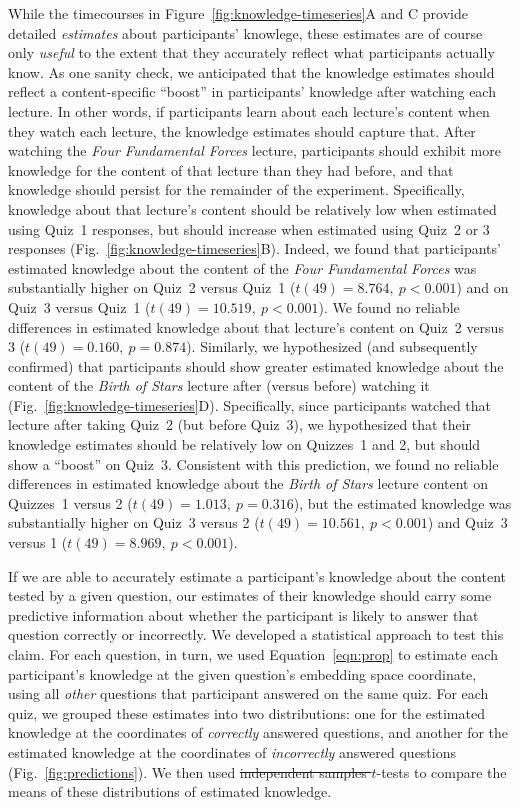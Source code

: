 \documentclass[10pt]{article}
\providecommand{\DIFaddtex}[1]{{\protect\color{blue}\uwave{#1}}} %
\providecommand{\DIFdeltex}[1]{{\protect\color{red}\sout{#1}}}                      %
\providecommand{\DIFaddbegin}{} %
\providecommand{\DIFaddend}{} %
\providecommand{\DIFdelbegin}{} %
\providecommand{\DIFdelend}{} %
\providecommand{\DIFadd}[1]{\texorpdfstring{\DIFaddtex{#1}}{#1}} %
\providecommand{\DIFdel}[1]{\texorpdfstring{\DIFdeltex{#1}}{}} %
\newcommand{\DIFscaledelfig}{0.5}
\newlength{\DIFdelgraphicswidth} %
\newlength{\DIFdelgraphicsheight} %
\newcommand{\DIFaddincludegraphics}[2][]{{\color{blue}\fbox{\DIFOincludegraphics[#1]{#2}}}} %
\newcommand{\DIFdelincludegraphics}[2][]{%
\sbox{\DIFdelgraphicsbox}{\DIFOincludegraphics[#1]{#2}}%
\settoboxwidth{\DIFdelgraphicswidth}{\DIFdelgraphicsbox} %
\settoboxtotalheight{\DIFdelgraphicsheight}{\DIFdelgraphicsbox} %
\scalebox{\DIFscaledelfig}{%
\parbox[b]{\DIFdelgraphicswidth}{\usebox{\DIFdelgraphicsbox}\\[-\baselineskip] \rule{\DIFdelgraphicswidth}{0em}}\llap{\resizebox{\DIFdelgraphicswidth}{\DIFdelgraphicsheight}{%
\setlength{\unitlength}{\DIFdelgraphicswidth}%
\begin{picture}(1,1)%
\thicklines\linethickness{2pt} %
{\color[rgb]{1,0,0}\put(0,0){\framebox(1,1){}}}%
{\color[rgb]{1,0,0}\put(0,0){\line( 1,1){1}}}%
{\color[rgb]{1,0,0}\put(0,1){\line(1,-1){1}}}%
\end{picture}%
}\hspace*{3pt}}} %
} %
\DeclareRobustCommand{\DIFaddbegin}{\DIFOaddbegin \let\includegraphics\DIFaddincludegraphics} %
\DeclareRobustCommand{\DIFaddend}{\DIFOaddend \let\includegraphics\DIFOincludegraphics} %
\DeclareRobustCommand{\DIFdelbegin}{\DIFOdelbegin \let\includegraphics\DIFdelincludegraphics} %
\DeclareRobustCommand{\DIFdelend}{\DIFOaddend \let\includegraphics\DIFOincludegraphics} %
\begin{document}
While the timecourses in Figure~\ref{fig:knowledge-timeseries}A and C provide
detailed \textit{estimates} about participants' knowlege, these estimates are
of course only \textit{useful} to the extent that they accurately reflect what
participants actually know. As one sanity check, we anticipated that the
knowledge estimates should reflect a content-specific ``boost'' in
participants' knowledge after watching each lecture. In other words, if
participants learn about each lecture's content when they watch each lecture,
the knowledge estimates should capture that. After watching the \textit{Four
Fundamental Forces} lecture, participants should exhibit more knowledge for the
content of that lecture than they had before, and that knowledge should persist
for the remainder of the experiment. Specifically, knowledge about that
lecture's content should be relatively low when estimated using Quiz~1
responses, but should increase when estimated using Quiz~2 or 3 responses
(Fig.~\ref{fig:knowledge-timeseries}B). Indeed, we found that participants'
estimated knowledge about the content of the \textit{Four Fundamental Forces}
was substantially higher on Quiz~2 versus Quiz~1 ($t(49) = 8.764,~p < 0.001$)
and on Quiz~3 versus Quiz~1 ($t(49) = 10.519,~p < 0.001$). We found no reliable
differences in estimated knowledge about that lecture's content on Quiz~2
versus 3 ($t(49) = 0.160,~p = 0.874$). Similarly, we hypothesized (and
subsequently confirmed) that participants should show greater estimated
knowledge about the content of the \textit{Birth of Stars} lecture after
(versus before) watching it (Fig.~\ref{fig:knowledge-timeseries}D).
Specifically, since participants watched that lecture after taking Quiz~2 (but
before Quiz~3), we hypothesized that their knowledge estimates should be
relatively low on Quizzes~1 and 2, but should show a ``boost'' on Quiz~3.
Consistent with this prediction, we found no reliable differences in estimated
knowledge about the \textit{Birth of Stars} lecture content on Quizzes~1 versus
2 ($t(49) = 1.013,~p = 0.316$), but the estimated knowledge was substantially
higher on Quiz~3 versus 2 ($t(49) = 10.561,~p < 0.001$) and Quiz~3 versus 1
($t(49) = 8.969,~p < 0.001$).

If we are able to accurately estimate a participant's knowledge about the
content tested by a given question, our estimates of their knowledge should
carry some predictive information about whether the participant is likely to
answer that question correctly or incorrectly. We developed a statistical
approach to test this claim. For each question, in turn, we used
Equation~\ref{eqn:prop} to estimate each participant's knowledge at the given
question's embedding space coordinate, using all \textit{other} questions that
participant answered on the same quiz. For each quiz, we grouped these
estimates into two distributions: one for the estimated knowledge at the
coordinates of \textit{correctly} answered questions, and another for the
estimated knowledge at the coordinates of \textit{incorrectly} answered
questions (Fig.~\ref{fig:predictions}). We then used \DIFdelbegin \DIFdel{independent samples $t$}\DIFdelend \DIFaddbegin \DIFadd{Mann-Whitney $U$}\DIFaddend -tests to
compare the means of these distributions of estimated knowledge.
\end{document}
